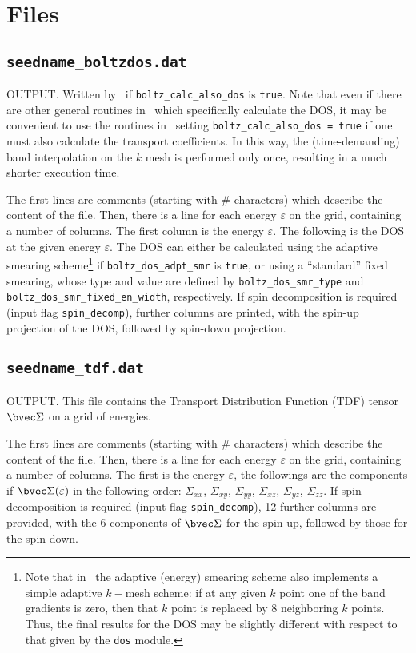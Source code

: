 \section{Files}
\subsection{{\tt seedname\_boltzdos.dat}}
OUTPUT. Written by \postw\ if {\tt boltz\_calc\_also\_dos} is \verb#true#. Note that even if there are other general routines in \postw\ which specifically calculate the DOS, it may be convenient to use the routines in \bw\ setting {\tt boltz\_calc\_also\_dos = true} if one must also calculate the transport coefficients. In this way, the (time-demanding) band interpolation on the $k$ mesh is performed only once, resulting in a much shorter execution time.

The first lines are comments (starting with \# characters) which describe the content of the file.
Then, there is a line for each energy $\varepsilon$ on the grid, containing a number of columns. The first column is the energy $\varepsilon$. The following is the DOS at the given energy $\varepsilon$.
The DOS can either be calculated using the adaptive smearing scheme\footnote{%
Note that in \bw\ the adaptive (energy) smearing scheme also implements a simple adaptive $k-$mesh scheme:
if at any given $k$ point one of the band gradients is zero, then that $k$ point is replaced by 8 neighboring $k$ points. Thus, the final results for the DOS may be slightly different with respect to that given by the {\tt dos} module.} if {\tt boltz\_dos\_adpt\_smr} is \verb#true#, or using a ``standard'' fixed smearing, whose type and value are defined by {\tt boltz\_dos\_smr\_type} and {\tt boltz\_dos\_smr\_fixed\_en\_width}, respectively.
If spin decomposition is required (input flag {\tt spin\_decomp}), further columns are printed, with the spin-up projection of the DOS, followed by spin-down projection.

\subsection{{\tt seedname\_tdf.dat}}
OUTPUT. This file contains the Transport Distribution Function (TDF) tensor $\bvec \Sigma$ on a grid of energies. 

The first lines are comments (starting with \# characters) which describe the content of the file.
Then, there is a line for each energy $\varepsilon$ on the grid, containing a number of columns. The first is the energy $\varepsilon$, the followings are the components if $\bvec \Sigma(\varepsilon)$ in the following order: $\Sigma_{xx}$, $\Sigma_{xy}$, $\Sigma_{yy}$, $\Sigma_{xz}$, $\Sigma_{yz}$, $\Sigma_{zz}$. If spin decomposition is required (input flag {\tt spin\_decomp}), 12 further columns are provided, with the 6 components of $\bvec \Sigma$ for the spin up, followed by those for the spin down.

